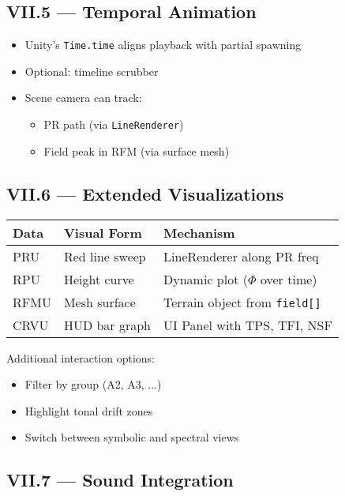 \documentclass{article}
\begin{document}
\subsection*{VII.5 — Temporal Animation}

\begin{itemize}
    \item Unity’s \texttt{Time.time} aligns playback with partial spawning
    \item Optional: timeline scrubber
    \item Scene camera can track:
    \begin{itemize}
        \item PR path (via \texttt{LineRenderer})
        \item Field peak in RFM (via surface mesh)
    \end{itemize}
\end{itemize}

\subsection*{VII.6 — Extended Visualizations}

\begin{center}
\begin{tabular}{|l|l|l|}
\hline
\textbf{Data} & \textbf{Visual Form} & \textbf{Mechanism} \\
\hline
PRU & Red line sweep & LineRenderer along PR freq \\
RPU & Height curve & Dynamic plot ($\Phi$ over time) \\
RFMU & Mesh surface & Terrain object from \texttt{field[]} \\
CRVU & HUD bar graph & UI Panel with TPS, TFI, NSF \\
\hline
\end{tabular}
\end{center}

Additional interaction options:

\begin{itemize}
    \item Filter by group (A2, A3, ...)
    \item Highlight tonal drift zones
    \item Switch between symbolic and spectral views
\end{itemize}

\subsection*{VII.7 — Sound Integration}
\end{document}
